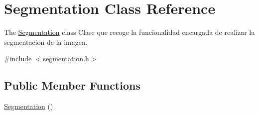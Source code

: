 \hypertarget{class_segmentation}{\section{Segmentation Class Reference}
\label{class_segmentation}
}


The \hyperlink{class_segmentation}{Segmentation} class Clase que recoge la funcionalidad encargada de realizar la segmentacion de la imagen.  




{\ttfamily \#include $<$segmentation.\+h$>$}

\subsection*{Public Member Functions}
\begin{DoxyCompactItemize}
\item 
\hypertarget{class_segmentation_a966891da37798baabb99bf0144d47675}{\hyperlink{class_segmentation_a966891da37798baabb99bf0144d47675}{Segmentation} ()}\label{class_segmentation_a966891da37798baabb99bf0144d47675}


\end{DoxyCompactItemize}
